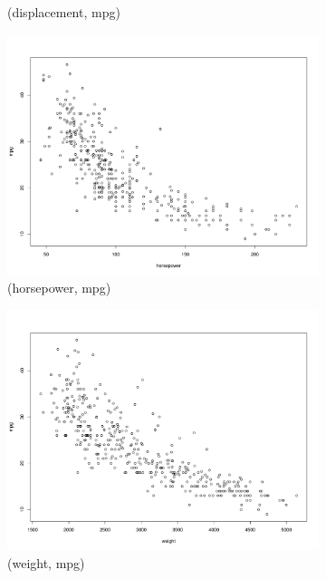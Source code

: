 \documentclass{homework}
\begin{document}
\begin{figure}
\begin{subfigure}[b]{0.3\textwidth}
        \caption{(displacement, mpg)}
        \label{fig:displacement}
    \end{subfigure}
    \begin{subfigure}[b]{0.3\textwidth}
        \includegraphics[width=\textwidth]{graphs/scatterHor.pdf}
        \caption{(horsepower, mpg)}
        \label{fig:HP}
    \end{subfigure}
    \begin{subfigure}[b]{0.3\textwidth}
        \includegraphics[width=\textwidth]{graphs/scatterWei.pdf}
        \caption{(weight, mpg)}
        \label{fig:HP}
    \end{subfigure}
    \begin{subfigure}[b]{0.3\textwidth}

\end{subfigure}
\end{figure}
\end{document}
